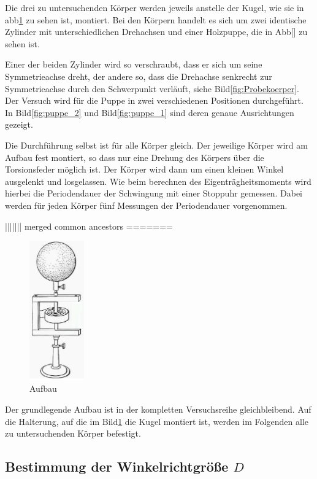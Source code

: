 Die drei zu untersuchenden Körper werden jeweils anstelle der Kugel, wie sie in abb\ref{fig:aufbau} zu sehen ist, montiert.
Bei den Körpern handelt es sich um zwei identische Zylinder mit unterschiedlichen Drehachsen und einer Holzpuppe, die in Abb[]
zu sehen ist. 

Einer der beiden Zylinder wird so verschraubt, dass er sich um seine Symmetrieachse dreht, der andere so, dass die Drehachse senkrecht
zur Symmetrieachse durch den Schwerpunkt verläuft, siehe Bild\ref{fig:Probekoerper}. Der Versuch wird für die Puppe in zwei 
verschiedenen Positionen durchgeführt. In Bild\ref{fig:puppe_2} und Bild\ref{fig:puppe_1} sind deren genaue Ausrichtungen gezeigt. 

Die Durchführung selbst ist für alle Körper gleich. Der jeweilige Körper wird am Aufbau fest montiert, so dass nur eine Drehung des 
Körpers über die Torsionsfeder möglich ist. Der Körper wird dann um einen kleinen Winkel ausgelenkt und losgelassen. Wie beim berechnen
des Eigenträgheitsmoments wird hierbei die Periodendauer der Schwingung mit einer Stoppuhr gemessen. Dabei werden für jeden Körper 
fünf Messungen der Periodendauer vorgenommen. 

||||||| merged common ancestors
=======
\begin{figure}
    \centering
    \includegraphics[height=6cm]{data/Bild_1}
    \caption{Aufbau}
    \label{fig:aufbau}
\end{figure}

Der grundlegende Aufbau ist in der kompletten Versuchsreihe gleichbleibend. Auf die Halterung, auf die im Bild\ref{fig:aufbau} die Kugel
montiert ist, werden im Folgenden alle zu untersuchenden Körper befestigt. 

\subsection{Bestimmung der Winkelrichtgröße $D$}

